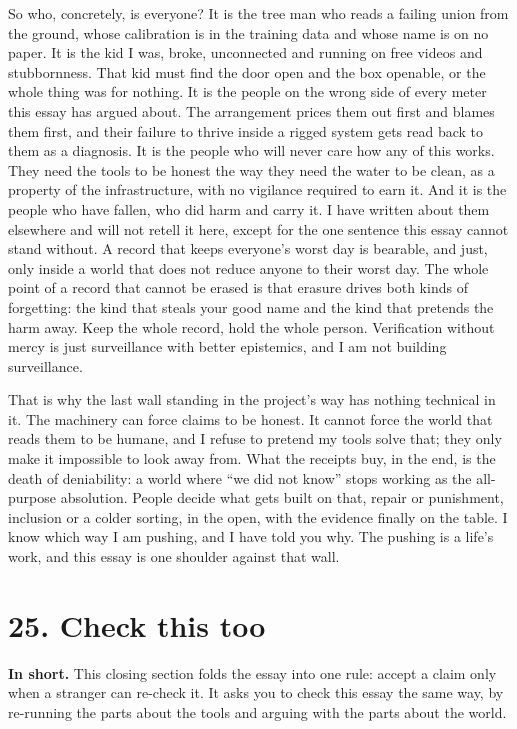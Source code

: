 \documentclass[11pt]{article}
\begin{document}
So who, concretely, is everyone? It is the tree man who reads a failing union from the ground, whose calibration is in the training data and whose name is on no paper. It is the kid I was, broke, unconnected and running on free videos and stubbornness. That kid must find the door open and the box openable, or the whole thing was for nothing. It is the people on the wrong side of every meter this essay has argued about. The arrangement prices them out first and blames them first, and their failure to thrive inside a rigged system gets read back to them as a diagnosis. It is the people who will never care how any of this works. They need the tools to be honest the way they need the water to be clean, as a property of the infrastructure, with no vigilance required to earn it. And it is the people who have fallen, who did harm and carry it. I have written about them elsewhere and will not retell it here, except for the one sentence this essay cannot stand without. A record that keeps everyone's worst day is bearable, and just, only inside a world that does not reduce anyone to their worst day. The whole point of a record that cannot be erased is that erasure drives both kinds of forgetting: the kind that steals your good name and the kind that pretends the harm away. Keep the whole record, hold the whole person. Verification without mercy is just surveillance with better epistemics, and I am not building surveillance.

That is why the last wall standing in the project's way has nothing technical in it. The machinery can force claims to be honest. It cannot force the world that reads them to be humane, and I refuse to pretend my tools solve that; they only make it impossible to look away from. What the receipts buy, in the end, is the death of deniability: a world where ``we did not know'' stops working as the all-purpose absolution. People decide what gets built on that, repair or punishment, inclusion or a colder sorting, in the open, with the evidence finally on the table. I know which way I am pushing, and I have told you why. The pushing is a life's work, and this essay is one shoulder against that wall.

\section*{25. Check this too}

\textbf{In short.} This closing section folds the essay into one rule: accept a claim only when a stranger can re-check it. It asks you to check this essay the same way, by re-running the parts about the tools and arguing with the parts about the world.
\end{document}
